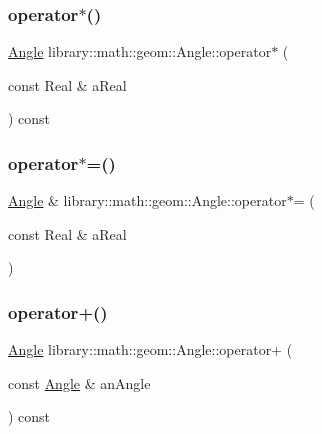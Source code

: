 \mbox{\label{classlibrary_1_1math_1_1geom_1_1_angle_af2c9c9ccc0e80ac2e569921dac5408d5}} 
\subsubsection{\texorpdfstring{operator$\ast$()}{operator*()}}
{\footnotesize\ttfamily \hyperlink{classlibrary_1_1math_1_1geom_1_1_angle}{Angle} library\+::math\+::geom\+::\+Angle\+::operator$\ast$ (\begin{DoxyParamCaption}\item[{const Real \&}]{a\+Real }\end{DoxyParamCaption}) const}

\mbox{\label{classlibrary_1_1math_1_1geom_1_1_angle_aa8e7869f7558f5b67e05709202578477}} 
\subsubsection{\texorpdfstring{operator$\ast$=()}{operator*=()}}
{\footnotesize\ttfamily \hyperlink{classlibrary_1_1math_1_1geom_1_1_angle}{Angle} \& library\+::math\+::geom\+::\+Angle\+::operator$\ast$= (\begin{DoxyParamCaption}\item[{const Real \&}]{a\+Real }\end{DoxyParamCaption})}

\mbox{\label{classlibrary_1_1math_1_1geom_1_1_angle_a4dff92c2349e609a401121f1940d2c6c}} 
\subsubsection{\texorpdfstring{operator+()}{operator+()}\hspace{0.1cm}{\footnotesize\ttfamily [1/2]}}
{\footnotesize\ttfamily \hyperlink{classlibrary_1_1math_1_1geom_1_1_angle}{Angle} library\+::math\+::geom\+::\+Angle\+::operator+ (\begin{DoxyParamCaption}\item[{const \hyperlink{classlibrary_1_1math_1_1geom_1_1_angle}{Angle} \&}]{an\+Angle }\end{DoxyParamCaption}) const}

